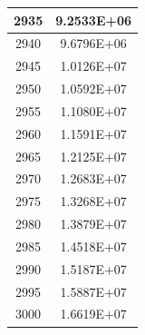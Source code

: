 \documentclass[a4paper]{article}
\begin{document}
\begin{tabular}{|c|c|}
		\hline
		2935 & 9.2533E+06 \\
		\hline
		2940 & 9.6796E+06 \\
		\hline
		2945 & 1.0126E+07 \\
		\hline
		2950 & 1.0592E+07 \\
		\hline
		2955 & 1.1080E+07 \\
		\hline
		2960 & 1.1591E+07 \\
		\hline
		2965 & 1.2125E+07 \\
		\hline
		2970 & 1.2683E+07 \\
		\hline
		2975 & 1.3268E+07 \\
		\hline
		2980 & 1.3879E+07 \\
		\hline
		2985 & 1.4518E+07 \\
		\hline
		2990 & 1.5187E+07 \\
		\hline
		2995 & 1.5887E+07 \\
		\hline
		3000 & 1.6619E+07 \\
		\hline
	\end{tabular}
	
	\normalsize
	
	\pagebreak
	
	\small
	
\end{document}
